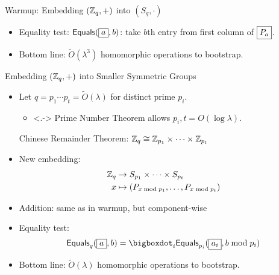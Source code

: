 \documentclass[shadow,xcolor=pdftex,svgnames,table,t]{beamer}
\begin{document}
\begin{frame}[label=embedwarmup]{Warmup: Embedding $(\mathbb{Z}_q,+)$ into
    $(S_q,\cdot)$}
\begin{itemize}
    \begin{itemize}
    \item<.-> Recall: Right-associative multiplication yields
      polynomial error growth.
    \end{itemize}

  \item<+-> Equality test: $\mathsf{Equals}(\fbox{$a$},b)$: take
    $b$th entry from first column of $\fbox{$P_a$}$.

    \medskip
  \item<+-> Bottom line: $\tilde{O}(\lambda^3)$ homomorphic operations
    to bootstrap.
  \end{itemize}
\end{frame}

\begin{frame}[label=embedsmall]{Embedding $(\mathbb{Z}_q,+)$ into Smaller Symmetric Groups}
  \begin{itemize}
  \item<+->Let $q=p_1 \cdots p_t = \tilde{O}(\lambda)$ for distinct
    prime $p_i$.
    \begin{itemize}
      \smallskip
    \item<.-> Prime Number Theorem allows $p_i, t=O(\log \lambda)$.
    \end{itemize}

    \onslide<+-> Chinese Remainder Theorem: $\mathbb{Z}_{q} \cong \mathbb{Z}_{p_1}
    \times \cdots \times \mathbb{Z}_{p_t}$

  \item<+-> New embedding:
    \begin{align*}
      \mathbb{Z}_q &\to S_{p_1} \times \cdots \times S_{p_t} \\
      x &\mapsto (P_{x \bmod{p_1}}, \ldots, P_{x \bmod{p_t}})\\
    \end{align*}
    \vspace{-30pt}

  \item<+-> Addition: same as in warmup, but component-wise

    \medskip
  \item<+-> Equality test:
    \[\mathsf{Equals}_q(\mathbox{a},b)=\bigboxdot_i\mathsf{Equals}_{p_i}(\mathbox{a_{i}},b
    \bmod p_i)\]
  \item<+-> Bottom line: $\tilde{O}(\lambda)$ homomorphic operations
    to bootstrap.
  \end{itemize}
\end{frame}
\end{document}
